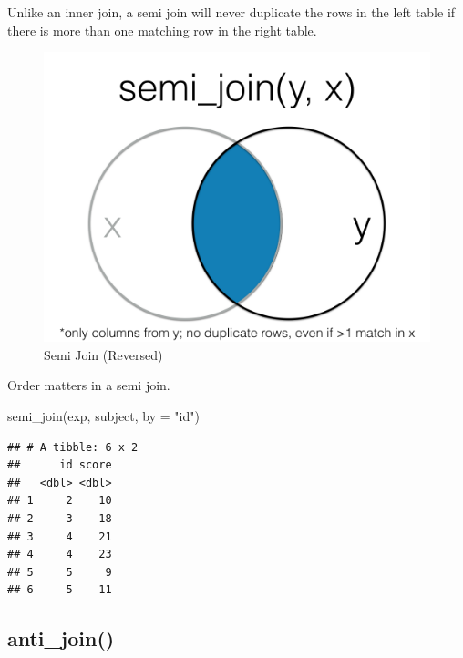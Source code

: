 \documentclass[
  oneside]{book}
\newenvironment{Shaded}{\begin{snugshade}}{\end{snugshade}}
\newcommand{\AttributeTok}[1]{\textcolor[rgb]{0.77,0.63,0.00}{#1}}
\newcommand{\FunctionTok}[1]{\textcolor[rgb]{0.00,0.00,0.00}{#1}}
\newcommand{\NormalTok}[1]{#1}
\newcommand{\StringTok}[1]{\textcolor[rgb]{0.31,0.60,0.02}{#1}}
\begin{document}
\begin{info}
Unlike an inner join, a semi join will never duplicate the rows in the left table if there is more than one matching row in the right table.

\end{info}

\begin{figure}

{\centering \includegraphics[width=1\linewidth]{images/joins/semi_join_rev} 

}

\caption{Semi Join (Reversed)}\label{fig:img-semi-join-rev}
\end{figure}

Order matters in a semi join.

\begin{Shaded}
\begin{Highlighting}[]
\FunctionTok{semi\_join}\NormalTok{(exp, subject, }\AttributeTok{by =} \StringTok{"id"}\NormalTok{)}
\end{Highlighting}
\end{Shaded}

\begin{verbatim}
## # A tibble: 6 x 2
##      id score
##   <dbl> <dbl>
## 1     2    10
## 2     3    18
## 3     4    21
## 4     4    23
## 5     5     9
## 6     5    11
\end{verbatim}

\hypertarget{anti_join}{%
\subsection{anti\_join()}\label{anti_join}}
\end{document}
